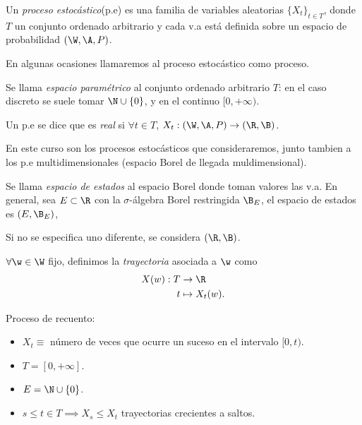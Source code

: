 \begin{ndef}
  Un \emph{proceso estocástico}(p.e) es una familia de variables aleatorias ${\{X_t\}}_{t \in T}$, donde $T$ un conjunto ordenado arbitrario y cada v.a está definida sobre un espacio de probabilidad $(\W, \A, P)$.
\end{ndef}

\begin{nota}
  En algunas ocasiones llamaremos al proceso estocástico como proceso.
\end{nota}

\begin{ndef}
  Se llama \emph{espacio paramétrico} al conjunto ordenado arbitrario $T$: en el caso discreto se suele tomar $\N \cup \{0\}$, y en el continuo $[0, +\infty)$.
\end{ndef}

\begin{ndef}
  Un p.e se dice que es \emph{real} si $\forall t \in T$, $X_t : (\W, \A, P) \to (\R, \B)$.
\end{ndef}

\begin{nota}
  En este curso son los procesos estocásticos que consideraremos, junto tambien a los p.e multidimensionales (espacio Borel de llegada muldimensional).
\end{nota}

\begin{ndef}
  Se llama \emph{espacio de estados} al espacio Borel donde toman valores las v.a. En general, sea $E \subset \R$ con la $\sigma$-álgebra Borel restringida $\B_E$, el espacio de estados es $(E, \B_E)$,
\end{ndef}

\begin{nota}
  Si no se especifica uno diferente, se considera $(\R, \B)$.
\end{nota}

\begin{ndef}[Trayectoria]
  $\forall \w \in \W$ fijo, definimos la \emph{trayectoria} asociada a $\w$ como
  \begin{align*}
    X(w): T & \to \R \\
    t & \mapsto X_t(w).
  \end{align*}
\end{ndef}

\begin{ejemplo}
  Proceso de recuento:
  \begin{itemize}
    \item $X_t \equiv$ número de veces que ocurre un suceso en el intervalo $[0, t)$.
    \item $T = [0, + \infty]$.
    \item $E = \N \cup \{0\}$.
    \item $s \leq t \in T \implies X_s \leq X_t$ trayectorias crecientes a saltos.
  \end{itemize}
\end{ejemplo}

